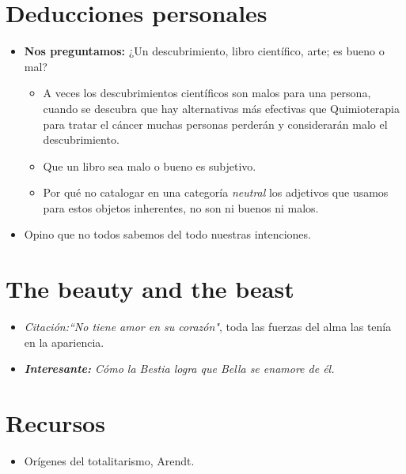 \section{Deducciones personales}
\begin{itemize}
    \item \textbf{Nos preguntamos:} ¿Un descubrimiento, libro científico, arte; es bueno o mal?
        \begin{itemize}
            \item A veces los descubrimientos científicos son malos para una persona, cuando se descubra que hay alternativas más efectivas que Quimioterapia para tratar el cáncer muchas personas perderán y considerarán malo el descubrimiento.
            \item Que un libro sea malo o bueno es subjetivo.
            \item Por qué no catalogar en una categoría \emph{neutral} los adjetivos que usamos para estos objetos inherentes, no son ni buenos ni malos.
        \end{itemize}
    
    \item Opino que no todos sabemos del todo nuestras intenciones.
\end{itemize}


\section{The beauty and the beast}
\begin{itemize}
    \item \emph{Citación:``No tiene amor en su corazón"}, toda las fuerzas del alma las tenía en la apariencia.
    \item \emph{\textbf{Interesante:} Cómo la Bestia logra que Bella se enamore de él.}
\end{itemize}

\section{Recursos}
\begin{itemize}
    \item Orígenes del totalitarismo, Arendt.
\end{itemize}





